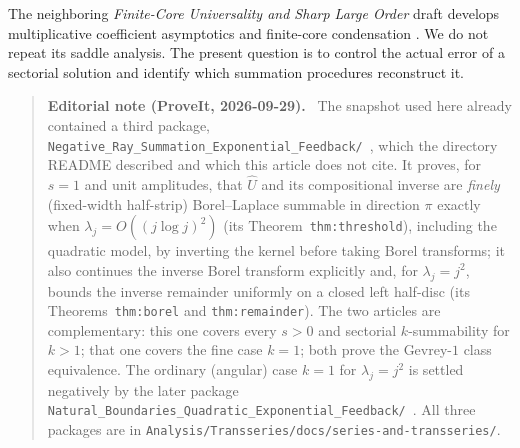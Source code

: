 \documentclass[11pt,a4paper]{article}
\numberwithin{equation}{section}
\theoremstyle{definition}\newtheorem{definition}[theorem]{Definition}
\theoremstyle{remark}\newtheorem{remark}[theorem]{Remark}
\newcommand{\Uhat}{\widehat U}\newcommand{\Qhat}{\widehat Q}\newcommand{\Vhat}{\widehat V}
\newenvironment{ednote}{\par\smallskip\begin{quote}\small\raggedright\textbf{Editorial note (ProveIt, 2026-09-29).}\ }{\end{quote}\smallskip}
\begin{document}
The neighboring \emph{Finite-Core Universality and Sharp Large Order}
draft develops multiplicative coefficient asymptotics and finite-core
condensation \cite{finitecore}. We do not repeat its saddle analysis.
The present question is to control the actual error of a sectorial
solution and identify which summation procedures reconstruct it.
\begin{ednote}
The snapshot used here already contained a third package, \nolinkurl{Negative_Ray_Summation_Exponential_Feedback/}~\cite{ed:negativeray}, which the directory README described
and which this article does not cite. It proves, for $s=1$ and unit
amplitudes, that $\Uhat$ and its compositional inverse are \emph{finely}
(fixed-width half-strip) Borel--Laplace summable in direction $\pi$
exactly when $\lambda_j=O((j\log j)^2)$ (its Theorem~\texttt{thm:threshold}),
including the quadratic model, by inverting the kernel before taking Borel
transforms; it also continues the inverse Borel transform explicitly and,
for $\lambda_j=j^2$, bounds the inverse remainder uniformly on a closed
left half-disc (its Theorems~\texttt{thm:borel} and \texttt{thm:remainder}). The two
articles are complementary: this one covers every $s>0$ and sectorial
$k$-summability for $k>1$; that one covers the fine case $k=1$; both prove
the Gevrey-$1$ class equivalence. The ordinary (angular) case $k=1$ for
$\lambda_j=j^2$ is settled negatively by the later package \nolinkurl{Natural_Boundaries_Quadratic_Exponential_Feedback/}~\cite{ed:naturalboundaries}.
All three packages are in
\nolinkurl{Analysis/Transseries/docs/series-and-transseries/}.
\end{ednote}
\end{document}
